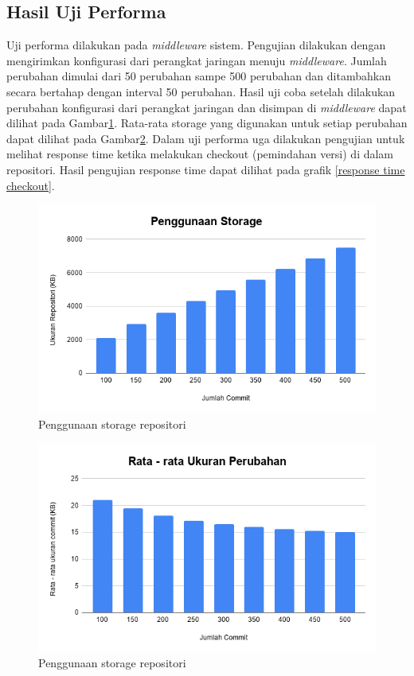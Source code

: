    	
    \subsection{Hasil Uji Performa}
    Uji performa dilakukan pada \textit{middleware} sistem. Pengujian dilakukan dengan mengirimkan konfigurasi dari perangkat jaringan menuju \textit{middleware}. Jumlah perubahan dimulai dari 50 perubahan sampe 500 perubahan dan ditambahkan secara bertahap dengan interval 50 perubahan. Hasil uji coba setelah dilakukan perubahan konfigurasi dari perangkat jaringan dan disimpan di \textit{middleware} dapat dilihat pada Gambar\ref{ukuranRepo}. Rata-rata storage yang digunakan untuk setiap perubahan dapat dilihat pada Gambar\ref{Rata-rataperubahan}. Dalam uji performa uga dilakukan pengujian untuk melihat response time ketika melakukan checkout (pemindahan versi) di dalam repositori. Hasil pengujian response time dapat dilihat pada grafik \ref{response time checkout}.
    	
    	\begin{figure}[H]
    	\centering
    	\includegraphics[width=\textwidth]{Images/C-5/Penggunaan-Storage.png}
    	\caption{Penggunaan storage repositori}
    	\label{ukuranRepo}
    	\end{figure}
    
    	\begin{figure}[H]
	    	\centering
	    	\includegraphics[width=\textwidth]{Images/C-5/Rata-rata-Ukuran-Perubahan.png}
	    	\caption{Penggunaan storage repositori}
	    	\label{Rata-rataperubahan}
	    \end{figure}
    
